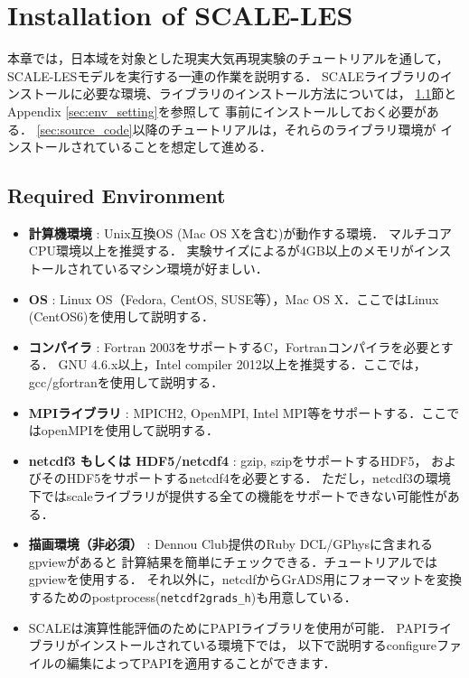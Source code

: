 \section{Installation of SCALE-LES}

本章では，日本域を対象とした現実大気再現実験のチュートリアルを通して，
SCALE-LESモデルを実行する一連の作業を説明する．
SCALEライブラリのインストールに必要な環境、ライブラリのインストール方法については，
\ref{sec:req_env}節とAppendix \ref{sec:env_setting}を参照して
事前にインストールしておく必要がある．
\ref{sec:source_code}以降のチュートリアルは，それらのライブラリ環境が
インストールされていることを想定して進める．


\subsection{Required Environment}
\label{sec:req_env}

\begin{itemize}
  \item {\bf 計算機環境} : Unix互換OS (Mac OS Xを含む)が動作する環境．
        マルチコアCPU環境以上を推奨する．
        実験サイズによるが4GB以上のメモリがインストールされているマシン環境が好ましい．
  \item {\bf OS} : Linux OS（Fedora, CentOS, SUSE等），Mac OS X．ここではLinux (CentOS6)を使用して説明する．
  \item {\bf コンパイラ} : Fortran 2003をサポートするC，Fortranコンパイラを必要とする．
        GNU 4.6.x以上，Intel compiler 2012以上を推奨する．ここでは，gcc/gfortranを使用して説明する．
  \item {\bf MPIライブラリ} : MPICH2, OpenMPI, Intel MPI等をサポートする．ここではopenMPIを使用して説明する．
  \item {\bf netcdf3 もしくは HDF5/netcdf4} : gzip, szipをサポートするHDF5，
        およびそのHDF5をサポートするnetcdf4を必要とする．
        ただし，netcdf3の環境下ではscaleライブラリが提供する全ての機能をサポートできない可能性がある．
  \item {\bf 描画環境（非必須）} : Dennou Club提供のRuby DCL/GPhysに含まれるgpviewがあると
        計算結果を簡単にチェックできる．チュートリアルではgpviewを使用する．
        それ以外に，netcdfからGrADS用にフォーマットを変換するためのpostprocess(\verb|netcdf2grads_h|)も用意している．
  \item SCALEは演算性能評価のためにPAPIライブラリを使用が可能．
        PAPIライブラリがインストールされている環境下では，
        以下で説明するconfigureファイルの編集によってPAPIを適用することができます．
\end{itemize}


